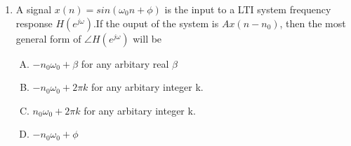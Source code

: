 \documentclass[journal,12pt,twocolumn]{IEEEtran}
\begin{document}
\begin{enumerate}
\item A signal $x(n)=sin(\omega_0n+\phi)$ is the input to a LTI system frequency response $H(e^{j\omega})$.If the ouput of the system is $Ax(n-n_0)$, then the most general form of $\angle H(e^{j\omega})$ will be

\begin{enumerate}[(A)]

\setlength\itemsep{1em}

\item $
-n_0\omega_0 + \beta 
$ for any arbitary real $\beta$
\item  $
- n_0\omega_0 + 2\pi k
$ for any arbitary integer k.
\item  $
n_0\omega_0 + 2\pi k
$ for any arbitary integer k.
\item $
- n_0\omega_0 + \phi
$

\end{enumerate}

%
%
%

%
%
%
%



\end{enumerate}
\end{document}
